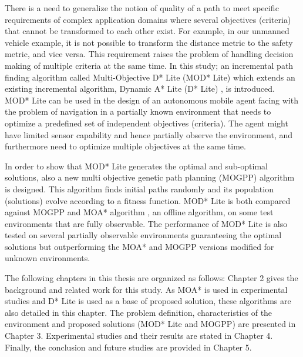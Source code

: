 There is a need to generalize the notion of quality of a path to meet specific requirements of complex application domains where several objectives (criteria) that cannot be transformed to each other exist. For example, in our unmanned vehicle example, it is not possible to transform the distance metric to the safety metric, and vice versa. This requirement raises the problem of handling decision making of multiple criteria at the same time. In this study; an incremental path finding algorithm called Multi-Objective D* Lite (MOD* Lite) which extends an existing incremental algorithm, Dynamic A* Lite (D* Lite) \cite{Koenig:2002}, is introduced. MOD* Lite \cite{Oral:2012} can be used in the design of an autonomous mobile agent facing with the problem of navigation in a partially known environment that needs to optimize a predefined set of independent objectives (criteria). The agent might have limited sensor capability and hence partially observe the environment, and furthermore need to optimize multiple objectives at the same time.

In order to show that MOD* Lite generates the optimal and sub-optimal solutions, also a new multi objective genetic path planning (MOGPP) algorithm is designed. This algorithm finds initial paths randomly and its population (solutions) evolve according to a fitness function. MOD* Lite is both compared against MOGPP and MOA* algorithm \cite{MOAStewart:1991}, an offline algorithm, on some test environments that are fully observable. The performance of MOD* Lite is also tested on several partially observable environments guaranteeing the optimal solutions but outperforming the MOA* and MOGPP versions modified for unknown environments.

The following chapters in this thesis are organized as follows: Chapter 2 gives the background and related work for this study. As MOA* is used in experimental studies and D* Lite is used as a base of proposed solution, these algorithms are also detailed in this chapter. The problem definition, characteristics of the environment and proposed solutions (MOD* Lite and MOGPP) are presented in Chapter 3. Experimental studies and their results are stated in Chapter 4. Finally, the conclusion and future studies are provided in Chapter 5.
